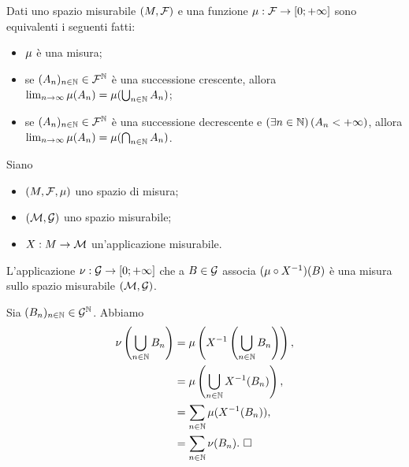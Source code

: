 \begin{Theorem}
	Dati uno spazio misurabile
  $(M,\mathcal{F})$ e una funzione
  $\mu: \mathcal{F} \rightarrow [0; +\infty]$ sono equivalenti i
  seguenti fatti:
	\begin{itemize}
		\item $\mu$ \`e una misura;
		\item se
      $(A_n)_{n \in \mathbb{N}} \in \mathcal{F}^\mathbb{N}$
      \`e una successione crescente, allora
      $\lim_{n \rightarrow \infty} \mu(A_n)
      = \mu(\bigcup_{n \in \mathbb{N}} A_n)$;
		\item se
      $(A_n)_{n \in \mathbb{N}} \in \mathcal{F}^\mathbb{N}$
      \`e una successione decrescente e
      $\left ( \exists n \in \mathbb{N} \right ) \left ( A_n < + \infty \right )$, allora
      $\lim_{n \rightarrow \infty} \mu(A_n)
      = \mu(\bigcap_{n \in \mathbb{N}} A_n)$.
	\end{itemize}
\end{Theorem}
\begin{Theorem}
  Siano
  \begin{itemize}
    \item $(M,\mathcal{F},\mu)$ uno spazio di misura;
    \item $(\mathcal{M},\mathcal{G})$ uno spazio misurabile;
    \item $X: M \rightarrow \mathcal{M}$
      un'applicazione misurabile.
  \end{itemize}
  L'applicazione
  $\nu: \mathcal{G} \rightarrow [0;+\infty]$
  che a $B \in \mathcal{G}$ associa
  $(\mu \circ X^{-1}) (B)$ \`e
  una misura sullo spazio misurabile $(\mathcal{M},\mathcal{G})$.
\end{Theorem}
\Proof Sia
$(B_n)_{n \in \mathbb{N}} \in \mathcal{G}^\mathbb{N}$.
Abbiamo
\begin{align*}
  \nu \left ( \bigcup_{n \in \mathbb{N}} B_n \right )
  &= \mu \left (
    X^{-1} \left (
    \bigcup_{n \in \mathbb{N}} B_n \right ) \right ),\\
  &= \mu \left (
    \bigcup_{n \in \mathbb{N}}
      X^{-1} (B_n) \right ),\\
  &= \sum_{n \in \mathbb{N}} \mu (
      X^{-1} (B_n) ),\\
  &= \sum_{n \in \mathbb{N}} \nu (B_n).\text{ $\square$}
\end{align*}
